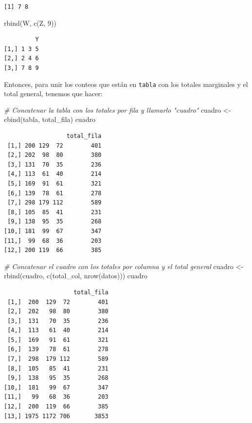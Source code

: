 \documentclass[
]{book}
\newenvironment{Shaded}{\begin{snugshade}}{\end{snugshade}}
\newcommand{\CommentTok}[1]{\textcolor[rgb]{0.56,0.35,0.01}{\textit{#1}}}
\newcommand{\DecValTok}[1]{\textcolor[rgb]{0.00,0.00,0.81}{#1}}
\newcommand{\FunctionTok}[1]{\textcolor[rgb]{0.00,0.00,0.00}{#1}}
\newcommand{\NormalTok}[1]{#1}
\newcommand{\OtherTok}[1]{\textcolor[rgb]{0.56,0.35,0.01}{#1}}
\begin{document}
\begin{verbatim}
[1] 7 8
\end{verbatim}

\begin{Shaded}
\begin{Highlighting}[]
\FunctionTok{rbind}\NormalTok{(W, }\FunctionTok{c}\NormalTok{(Z, }\DecValTok{9}\NormalTok{))}
\end{Highlighting}
\end{Shaded}

\begin{verbatim}
         Y
[1,] 1 3 5
[2,] 2 4 6
[3,] 7 8 9
\end{verbatim}

Entonces, para unir los conteos que están en \texttt{tabla} con los totales marginales y el total general, tenemos que hacer:

\begin{Shaded}
\begin{Highlighting}[]
\CommentTok{\# Concatenar la tabla con los totales por fila y llamarlo "cuadro"}
\NormalTok{cuadro }\OtherTok{\textless{}{-}} \FunctionTok{cbind}\NormalTok{(tabla, total\_fila)}
\NormalTok{cuadro}
\end{Highlighting}
\end{Shaded}

\begin{verbatim}
                  total_fila
 [1,] 200 129  72        401
 [2,] 202  98  80        380
 [3,] 131  70  35        236
 [4,] 113  61  40        214
 [5,] 169  91  61        321
 [6,] 139  78  61        278
 [7,] 298 179 112        589
 [8,] 105  85  41        231
 [9,] 138  95  35        268
[10,] 181  99  67        347
[11,]  99  68  36        203
[12,] 200 119  66        385
\end{verbatim}

\begin{Shaded}
\begin{Highlighting}[]
\CommentTok{\# Concatenar el cuadro con los totales por columna y el total general}
\NormalTok{cuadro }\OtherTok{\textless{}{-}} \FunctionTok{rbind}\NormalTok{(cuadro, }\FunctionTok{c}\NormalTok{(total\_col, }\FunctionTok{nrow}\NormalTok{(datos)))}
\NormalTok{cuadro}
\end{Highlighting}
\end{Shaded}

\begin{verbatim}
                    total_fila
 [1,]  200  129  72        401
 [2,]  202   98  80        380
 [3,]  131   70  35        236
 [4,]  113   61  40        214
 [5,]  169   91  61        321
 [6,]  139   78  61        278
 [7,]  298  179 112        589
 [8,]  105   85  41        231
 [9,]  138   95  35        268
[10,]  181   99  67        347
[11,]   99   68  36        203
[12,]  200  119  66        385
[13,] 1975 1172 706       3853
\end{verbatim}
\end{document}
